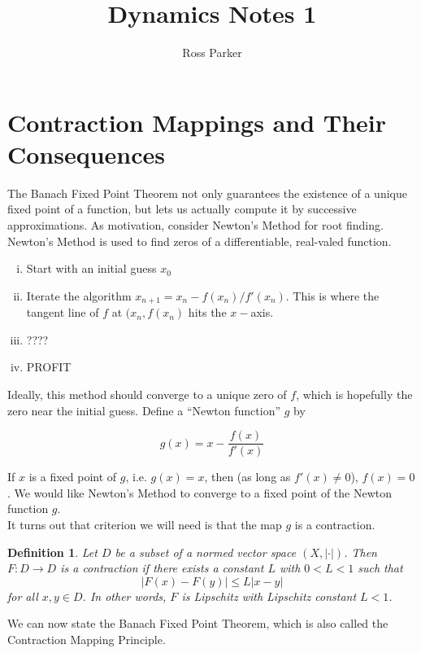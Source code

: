 \documentclass{article}
\title{Dynamics Notes 1}
\author{Ross Parker}
\newtheorem{definition}{Definition}[section]
\begin{document}
\section{Contraction Mappings and Their Consequences}

The Banach Fixed Point Theorem not only guarantees the existence of a unique fixed point of a function, but lets us actually compute it by successive approximations. As motivation, consider Newton's Method for root finding.\\

Newton's Method is used to find zeros of a differentiable, real-valed function.

\begin{enumerate}[(i)]
\item Start with an initial guess $x_0$
\item Iterate the algorithm $x_{n+1} = x_n - f(x_n)/f'(x_n)$. This is where the tangent line of $f$ at $(x_n, f(x_n)$ hits the $x-$axis.
\item ????
\item PROFIT
\end{enumerate}

Ideally, this method should converge to a unique zero of $f$, which is hopefully the zero near the initial guess. Define a ``Newton function'' $g$ by

\[
g(x) = x - \frac{f(x)}{f'(x)}
\]

If $x$ is a fixed point of $g$, i.e. $g(x) = x$, then (as long as $f'(x) \neq 0$), $f(x) = 0$. We would like Newton's Method to converge to a fixed point of the Newton function $g$. \\

It turns out that criterion we will need is that the map $g$ is a contraction.\\

\begin{definition}Let $D$ be a subset of a normed vector space $(X, |\cdot|)$. Then $F: D \rightarrow D$ is a \emph{contraction} if there exists a constant $L$ with $0 < L < 1$ such that 
\[
|F(x) - F(y)| \leq L |x - y|
\]
for all $x, y \in D$. In other words, $F$ is Lipschitz with Lipschitz constant $L < 1$.
\end{definition}

We can now state the Banach Fixed Point Theorem, which is also called the Contraction Mapping Principle.\\

\end{document}
